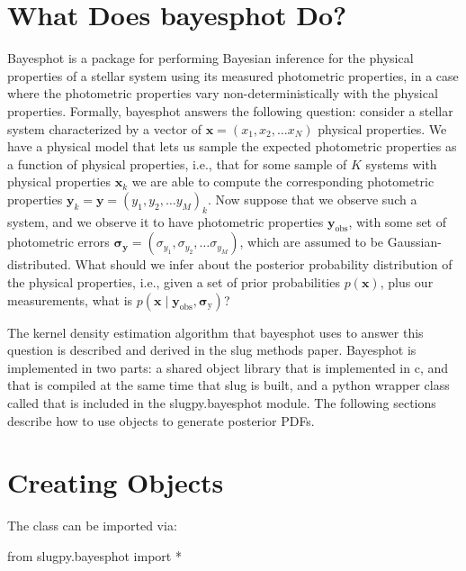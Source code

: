 \documentclass[letterpaper,10pt,english]{sphinxmanual}
\begin{document}
\section{What Does bayesphot Do?}
\label{\detokenize{bayesphot:what-does-bayesphot-do}}
Bayesphot is a package for performing Bayesian inference for the physical properties of a stellar system using its measured photometric properties, in a case where the photometric properties vary non-deterministically with the physical properties. Formally, bayesphot answers the following question: consider a stellar system characterized by a vector of \(\mathbf{x} = (x_1, x_2, \ldots x_N)\) physical properties. We have a physical model that lets us sample the expected photometric properties as a function of physical properties, i.e., that for some sample of \(K\) systems with physical properties \(\mathbf{x}_k\) we are able to compute the corresponding photometric properties \(\mathbf{y}_k = \mathbf{y} = (y_1, y_2, \ldots y_M)_k\). Now suppose that we observe such a system, and we observe it to have photometric properties \(\mathbf{y}_{\mathrm{obs}}\), with some set of photometric errors \(\mathbf{\sigma}_{\mathbf{y}} = (\sigma_{y_1}, \sigma_{y_2}, \ldots \sigma_{y_M})\), which are assumed to be Gaussian-distributed. What should we infer about the posterior probability distribution of the physical properties, i.e., given a set of prior probabilities \(p(\mathbf{x})\), plus our measurements, what is \(p(\mathbf{x} \mid \mathbf{y}_{\mathrm{obs}}, \mathbf{\sigma}_{\mathrm{y}})\)?

The kernel density estimation algorithm that bayesphot uses to answer this question is described and derived in the slug methods paper. Bayesphot is implemented in two parts: a shared object library that is implemented in c, and that is compiled at the same time that slug is built, and a python wrapper class called  that is included in the slugpy.bayesphot module. The following sections describe how to use  objects to generate posterior PDFs.


\section{Creating  Objects}
\label{\detokenize{bayesphot:creating-bp-objects}}
The  class can be imported via:

\begin{sphinxVerbatim}[commandchars=\\\{\}]
from slugpy.bayesphot import *
\end{sphinxVerbatim}
\end{document}
